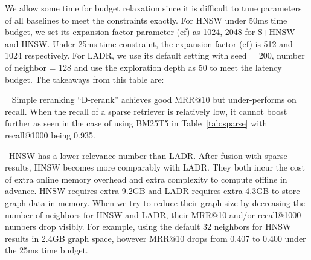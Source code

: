 We allow some time for budget relaxation since it is difficult to tune parameters of all baselines to meet the constraints exactly. 
For HNSW under 50ms time budget, we set its expansion factor parameter (ef) as 1024, 
2048 for S$+$HNSW and HNSW. 
Under 25ms time constraint, the expansion factor (ef) is  512 and  1024 respectively. 
For LADR, we use its default setting with seed = 200, number of neighbor = 128 and use the exploration depth as 50 to meet the latency budget.
The takeaways from this table are:

\textbullet\ 
Simple reranking ``D-rerank'' achieves good MRR@10 but under-performs on recall.
When the recall of a sparse retriever is relatively low, it cannot boost further as seen in the case of using BM25T5 in Table~\ref{tab:sparse} with recall@1000 being 0.935.

\textbullet\ 
HNSW has a lower relevance number than LADR.
After fusion with sparse results, HNSW becomes  more comparably with LADR.
They  both incur the cost   of extra online memory overhead  and extra complexity to compute offline in advance.
HNSW requires extra 9.2GB and LADR requires extra 4.3GB to store graph data in memory. 
When we  try to reduce their graph size by decreasing  the number of neighbors for HNSW and LADR, their  MRR@10 and/or  recall@1000 numbers drop visibly. For example, 
using the default 32 neighbors for HNSW results in 2.4GB graph space, however  MRR@10 drops from 0.407 to 0.400 under the 25ms time budget. 

